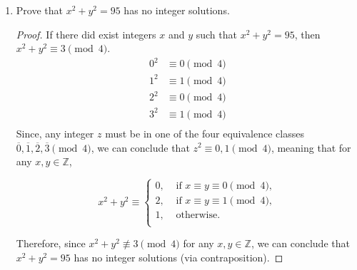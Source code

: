 \documentclass[11pt]{article}
\newcommand{\Z}{\mathbb{Z}}
\begin{document}
\begin{enumerate}
    \newpage
    \item Prove that \(x^2 + y^2 = 95\) has no integer solutions.
      \begin{proof}
        If there did exist integers \(x\) and \(y\) such that \(x^2 + y^2 = 95\), then \(x^2 + y^2 \equiv 3 \pmod4\).
        \begin{align*}
          0^2 &\equiv 0 \pmod4 \\
          1^2 &\equiv 1 \pmod4 \\
          2^2 &\equiv 0 \pmod4 \\
          3^2 &\equiv 1 \pmod4 \\
        \end{align*}
        Since, any integer \(z\) must be in one of the four equivalence classes \(\overline{0},\overline{1},\overline{2},\overline{3} \pmod4\), we can conclude that \(z^2 \equiv 0,1 \pmod4\), meaning that for any \(x,y \in \Z\), 

        \[x^2 + y^2 \equiv \begin{cases}
          0, &\text{ if } x \equiv y \equiv 0 \pmod4, \\
          2, &\text{ if } x \equiv y \equiv 1 \pmod4, \\
          1, &\text{ otherwise.} \\
        \end{cases}\]

        Therefore, since \(x^2 + y^2 \not\equiv 3 \pmod4\) for any \(x,y \in \Z\), we can conclude that \(x^2 + y^2 = 95\) has no integer solutions (via contraposition).
      \end{proof}
      
  \end{enumerate}
\end{document}
